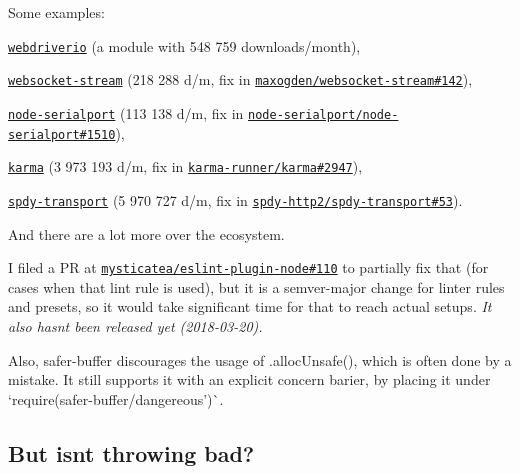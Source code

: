 Some examples\+:
\begin{DoxyItemize}
\item \href{https://github.com/webdriverio/webdriverio/commit/05cbd3167c12e4930f09ef7cf93b127ba4effae4#diff-124380949022817b90b622871837d56cR31}{\tt webdriverio} (a module with 548 759 downloads/month),
\item \href{https://github.com/maxogden/websocket-stream/commit/c9312bd24d08271687d76da0fe3c83493871cf61}{\tt websocket-\/stream} (218 288 d/m, fix in \href{https://github.com/maxogden/websocket-stream/pull/142}{\tt maxogden/websocket-\/stream\#142}),
\item \href{https://github.com/node-serialport/node-serialport/commit/e8d9d2b16c664224920ce1c895199b1ce2def48c}{\tt node-\/serialport} (113 138 d/m, fix in \href{https://github.com/node-serialport/node-serialport/pull/1510}{\tt node-\/serialport/node-\/serialport\#1510}),
\item \href{https://github.com/karma-runner/karma/commit/3d94b8cf18c695104ca195334dc75ff054c74eec}{\tt karma} (3 973 193 d/m, fix in \href{https://github.com/karma-runner/karma/pull/2947}{\tt karma-\/runner/karma\#2947}),
\item \href{https://github.com/spdy-http2/spdy-transport/commit/5375ac33f4a62a4f65bcfc2827447d42a5dbe8b1}{\tt spdy-\/transport} (5 970 727 d/m, fix in \href{https://github.com/spdy-http2/spdy-transport/pull/53}{\tt spdy-\/http2/spdy-\/transport\#53}).
\item And there are a lot more over the ecosystem.
\end{DoxyItemize}

I filed a PR at \href{https://github.com/mysticatea/eslint-plugin-node/pull/110}{\tt mysticatea/eslint-\/plugin-\/node\#110} to partially fix that (for cases when that lint rule is used), but it is a semver-\/major change for linter rules and presets, so it would take significant time for that to reach actual setups. {\itshape It also hasn\textquotesingle{}t been released yet (2018-\/03-\/20).}

Also, {\ttfamily safer-\/buffer} discourages the usage of {\ttfamily .alloc\+Unsafe()}, which is often done by a mistake. It still supports it with an explicit concern barier, by placing it under `require(\textquotesingle{}safer-\/buffer/dangereous')\`{}.

\subsection*{But isn\textquotesingle{}t throwing bad?}

